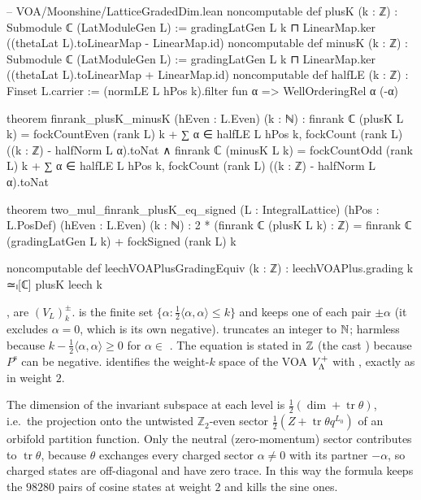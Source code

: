 \begin{leancode}
-- VOA/Moonshine/LatticeGradedDim.lean
noncomputable def plusK (k : ℤ) : Submodule ℂ (LatModuleGen L) :=
  gradingLatGen L k ⊓ LinearMap.ker ((thetaLat L).toLinearMap - LinearMap.id)
noncomputable def minusK (k : ℤ) : Submodule ℂ (LatModuleGen L) :=
  gradingLatGen L k ⊓ LinearMap.ker ((thetaLat L).toLinearMap + LinearMap.id)
noncomputable def halfLE (k : ℤ) : Finset L.carrier :=
  (normLE L hPos k).filter fun α => WellOrderingRel α (-α)

theorem finrank_plusK_minusK (hEven : L.Even) (k : ℕ) :
    finrank ℂ (plusK L k) = fockCountEven (rank L) k
        + ∑ α ∈ halfLE L hPos k, fockCount (rank L) ((k : ℤ) - halfNorm L α).toNat ∧
      finrank ℂ (minusK L k) = fockCountOdd (rank L) k
        + ∑ α ∈ halfLE L hPos k, fockCount (rank L) ((k : ℤ) - halfNorm L α).toNat

theorem two_mul_finrank_plusK_eq_signed (L : IntegralLattice) (hPos : L.PosDef) (hEven : L.Even)
    (k : ℕ) :
    2 * (finrank ℂ (plusK L k) : ℤ) = finrank ℂ (gradingLatGen L k) + fockSigned (rank L) k

noncomputable def leechVOAPlusGradingEquiv (k : ℤ) : leechVOAPlus.grading k ≃ₗ[ℂ] plusK leech k
\end{leancode}

\begin{dictionary}
,  are $(V_L)^\pm_k$.  is the finite set
$\{\alpha:\tfrac12\langle\alpha,\alpha\rangle\le k\}$ and  keeps one of each pair $\pm\alpha$
(it excludes $\alpha=0$, which is its own negative).  truncates an integer to ${\mathbb{N}}$;
harmless because $k-\tfrac12\langle\alpha,\alpha\rangle\ge0$ for $\alpha\in$ . The equation
 is stated in ${\mathbb{Z}}$ (the cast ) because
$P^{\mathrm s}$ can be negative.  identifies the weight-$k$ space
of the VOA $V_{\Lambda}^+$ with , exactly as in weight $2$.
\end{dictionary}

\begin{physics}
The dimension of the invariant subspace at each level is $\tfrac12(\dim+\operatorname{tr}\theta)$, i.e.\ the projection onto the untwisted $\mathbb Z_2$-even sector $\tfrac12(Z+\operatorname{tr}\theta q^{L_0})$ of an orbifold partition function. Only the neutral (zero-momentum) sector contributes to $\operatorname{tr}\theta$, because $\theta$ exchanges every charged sector $\alpha\ne0$ with its partner $-\alpha$, so charged states are off-diagonal and have zero trace. In this way the formula keeps the $98280$ pairs of cosine states at weight $2$ and kills the sine ones.
\end{physics}

